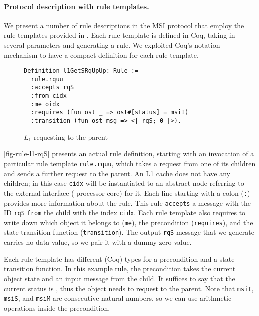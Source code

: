 \documentclass[sigplan,10pt,review,anonymous,screen]{acmart}\settopmatter{printfolios=true,printccs=false,printacmref=false}
\def\slstinline{\lstinline[basicstyle=\ttfamily\small]}
\begin{document}
\paragraph{Protocol description with rule templates.}

We present a number of rule descriptions in the MSI protocol that employ the rule templates provided in \hemiola{}.
Each rule template is defined in Coq, taking in several parameters and generating a rule.
We exploited Coq's notation mechanism to have a compact definition for each rule template.

\begin{figure}[h]
  \centering
\begin{lstlisting}
Definition l1GetSRqUpUp: Rule :=
  rule.rquu
  :accepts rqS
  :from cidx
  :me oidx
  :requires (fun ost _ => ost#[status] = msiI)
  :transition (fun ost msg => <| rqS; 0 |>).
\end{lstlisting}
  \caption{$L_1$ requesting \stS{} to the parent}
  \label{fig-rule-l1-rqS}
\end{figure}

\autoref{fig-rule-l1-rqS} presents an actual rule definition, starting with an invocation of a particular rule template \slstinline{rule.rquu}, which takes a request from one of its children and sends a further request to the parent.
An L1 cache does not have any children; in this case \slstinline{cidx} will be instantiated to an abstract node referring to the external interface (\ie{} processor core) for it.
Each line starting with a colon (\slstinline{:}) provides more information about the rule.
This rule \slstinline{accepts} a message with the ID \slstinline{rqS} \slstinline{from} the child with the index \slstinline{cidx}.
Each rule template also requires to write down which object it belongs to (\slstinline{me}), the precondition (\slstinline{requires}), and the state-transition function (\slstinline{transition}).
The output \slstinline{rqS} message that we generate carries no data value, so we pair it with a dummy zero value.

Each rule template has different (Coq) types for a precondition and a state-transition function.
In this example rule, the precondition takes the current object state and an input message from the child.
It suffices to say that the current status is \stI{}, thus the object needs to request to the parent.
Note that \slstinline{msiI}, \slstinline{msiS}, and \slstinline{msiM} are consecutive natural numbers, so we can use arithmetic operations inside the precondition.
\end{document}
